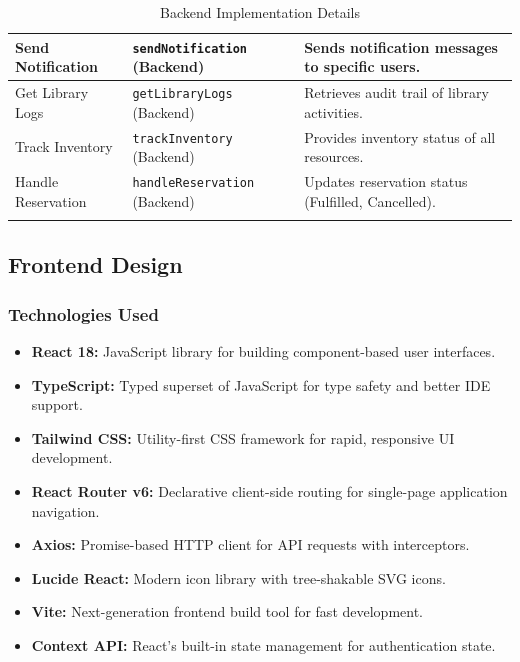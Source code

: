 \documentclass[11pt,a4paper]{article}
\begin{document}
\begin{longtable}{@{}p{3cm}p{4cm}p{6cm}@{}}
Send Notification & \texttt{sendNotification} (Backend) & Sends notification messages to specific users. \\
\midrule

Get Library Logs & \texttt{getLibraryLogs} (Backend) & Retrieves audit trail of library activities. \\
\midrule

Track Inventory & \texttt{trackInventory} (Backend) & Provides inventory status of all resources. \\
\midrule

Handle Reservation & \texttt{handleReservation} (Backend) & Updates reservation status (Fulfilled, Cancelled). \\

\bottomrule
\caption{Backend Implementation Details}
\end{longtable}

\subsection{Frontend Design}

\subsubsection{Technologies Used}

\begin{itemize}
    \item \textbf{React 18:} JavaScript library for building component-based user interfaces.
    \item \textbf{TypeScript:} Typed superset of JavaScript for type safety and better IDE support.
    \item \textbf{Tailwind CSS:} Utility-first CSS framework for rapid, responsive UI development.
    \item \textbf{React Router v6:} Declarative client-side routing for single-page application navigation.
    \item \textbf{Axios:} Promise-based HTTP client for API requests with interceptors.
    \item \textbf{Lucide React:} Modern icon library with tree-shakable SVG icons.
    \item \textbf{Vite:} Next-generation frontend build tool for fast development.
    \item \textbf{Context API:} React's built-in state management for authentication state.
\end{itemize}
\end{document}
